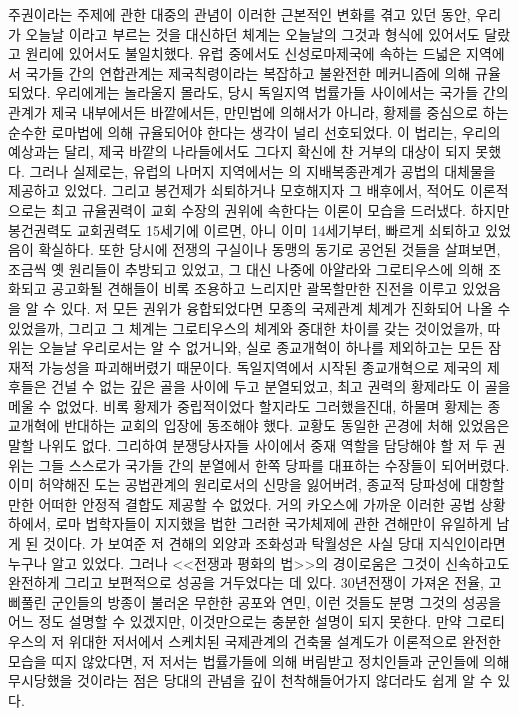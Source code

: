 주권이라는 주제에 관한 대중의 관념이 이러한 근본적인 변화를 겪고 있던 동안,
우리가 오늘날 이라고 부르는 것을 대신하던 체계는
오늘날의 그것과 형식에 있어서도 달랐고 원리에 있어서도 불일치했다.
유럽 중에서도 신성로마제국에 속하는 드넓은 지역에서
국가들 간의 연합관계는 제국칙령이라는 복잡하고 불완전한 메커니즘에 의해
규율되었다.
우리에게는 놀라울지 몰라도, 당시 독일지역 법률가들 사이에서는
국가들 간의 관계가 제국 내부에서든 바깥에서든,
만민법에 의해서가 아니라,
황제를 중심으로 하는 순수한 로마법에 의해
규율되어야 한다는 생각이 널리 선호되었다.
이 법리는, 우리의 예상과는 달리,
제국 바깥의 나라들에서도
그다지 확신에 찬 거부의 대상이 되지 못했다.
그러나 실제로는, 유럽의 나머지 지역에서는
의 지배복종관계가 공법의 대체물을 제공하고 있었다.
그리고 봉건제가 쇠퇴하거나 모호해지자 그 배후에서,
적어도 이론적으로는 최고 규율권력이 교회 수장의 권위에 속한다는 이론이
모습을 드러냈다.
하지만 봉건권력도 교회권력도 15세기에 이르면, 아니 이미 14세기부터,
빠르게 쇠퇴하고 있었음이 확실하다.
또한
당시에 전쟁의 구실이나 동맹의 동기로 공언된 것들을 살펴보면,
조금씩 옛 원리들이 추방되고 있었고,
그 대신 나중에 아얄라와 그로티우스에 의해 조화되고 공고화될 견해들이
비록 조용하고 느리지만
괄목할만한 진전을 이루고 있었음을 알 수 있다.
저 모든 권위가 융합되었다면 모종의 국제관계 체계가 진화되어 나올 수 있었을까,
그리고 그 체계는 그로티우스의 체계와 중대한 차이를 갖는 것이었을까, 따위는
오늘날 우리로서는 알 수 없거니와, 실로 종교개혁이 하나를 제외하고는
모든 잠재적 가능성을 파괴해버렸기 때문이다.
독일지역에서 시작된 종교개혁으로 제국의 제후들은 건널 수 없는 깊은 골을
사이에 두고 분열되었고, 최고 권력의 황제라도
이 골을 메울 수 없었다.
비록 황제가 중립적이었다 할지라도 그러했을진대,
하물며 황제는 종교개혁에 반대하는 교회의 입장에 동조해야 했다.
교황도 동일한 곤경에 처해 있었음은 말할 나위도 없다.
그리하여 분쟁당사자들 사이에서 중재 역할을 담당해야 할 저 두 권위는
그들 스스로가 국가들 간의 분열에서 한쪽 당파를 대표하는 수장들이 되어버렸다.
이미 허약해진 도는 공법관계의 원리로서의 신망을 잃어버려,
종교적 당파성에 대항할만한 어떠한 안정적 결합도 제공할 수 없었다.
거의 카오스에 가까운 이러한 공법 상황 하에서,
로마 법학자들이 지지했을 법한 그러한 국가체제에 관한 견해만이
유일하게 남게 된 것이다.
가 보여준 저 견해의 외양과 조화성과 탁월성은
사실 당대 지식인이라면 누구나 알고 있었다.
그러나 <<전쟁과 평화의 법>>의 경이로움은
그것이 신속하고도 완전하게 그리고 보편적으로 성공을 거두었다는 데 있다.
30년전쟁이 가져온 전율, 고삐풀린 군인들의 방종이 불러온 무한한 공포와 연민,
이런 것들도 분명 그것의 성공을 어느 정도 설명할 수 있겠지만,
이것만으로는 충분한 설명이 되지 못한다.
만약 그로티우스의 저 위대한 저서에서 스케치된 국제관계의 건축물 설계도가
이론적으로 완전한 모습을 띠지 않았다면,
저 저서는 법률가들에 의해 버림받고
정치인들과 군인들에 의해 무시당했을 것이라는 점은
당대의 관념을 깊이 천착해들어가지 않더라도 쉽게 알 수 있다.

